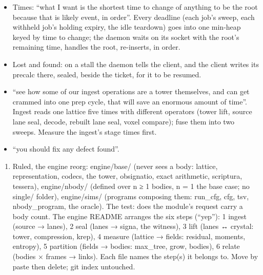 \begin{itemize}
\item Times: “what I want is the shortest time to change of anything to be the root because that is likely event, in order”. Every deadline (each job's sweep, each withheld job's holding expiry, the idle teardown) goes into one min-heap keyed by time to change; the daemon waits on its socket with the root's remaining time, handles the root, re-inserts, in order.
\item Lost and found: on a stall the daemon tells the client, and the client writes its precalc there, sealed, beside the ticket, for it to be resumed.
\item “see how some of our ingest operations are a tower themselves, and can get crammed into one prep cycle, that will save an enormous amount of time”. Ingest reads one lattice five times with different operators (tower lift, source lane seal, decode, rebuilt lane seal, voxel compare); fuse them into two sweeps. Measure the ingest's stage times first.
\item “you should fix any defect found”.
\end{itemize}

\begin{enumerate}
\item Ruled, the engine reorg: engine/base/ (never sees a body: lattice, representation, codecs, the tower, obsignatio, exact arithmetic, scriptura, tessera), engine/nbody/ (defined over n ≥ 1 bodies, n = 1 the base case; no single/ folder), engine/sims/ (programs composing them: run\_\allowbreak{}cfg, cfg, tsv, nbody\_\allowbreak{}program, the oracle). The test: does the module's request carry a body count. The engine README arranges the six steps (“yep”): 1 ingest (source → lanes), 2 seal (lanes → signa, the witness), 3 lift (lanes ↔ crystal: tower, compression, krep), 4 measure (lattice → fields: residual, moments, entropy), 5 partition (fields → bodies: max\_\allowbreak{}tree, grow, bodies), 6 relate (bodies × frames → links). Each file names the step(s) it belongs to. Move by paste then delete; git index untouched.
\end{enumerate}

